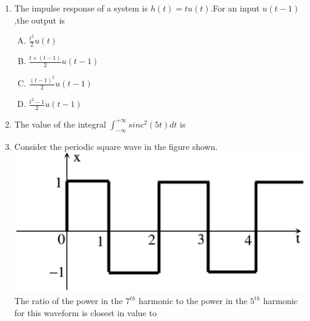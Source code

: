 \documentclass[journal,12pt,twocolumn]{IEEEtran}
\begin{document}
\begin{enumerate}
\begin{enumerate}[(A)]
\end{enumerate}


\item The impulse response of a system is $h(t)=tu(t)$.For an input $u(t-1)$,the output is
\begin{enumerate}[(A)]

\setlength\itemsep{2em}

\item $\frac{t^{2}}{2}u(t)$
\item $\frac{t\times (t-1)}{2}u(t-1)$
\item $\frac{(t-1)^{2}}{2}u(t-1)$
\item $\frac{t^{2}-1}{2}u(t-1)$
\end{enumerate}

\item The value of the integral $\int_{-\infty}^{+\infty} sinc^{2}(5t) dt$ is \underline{\hspace{1cm}}

\item Consider the periodic square wave in the figure shown.
\includegraphics[scale=0.4]{fig13.eps}
\newline The ratio of the power in the $7^{th}$ harmonic to the power in the $5^{th}$ harmonic for this waveform is closest in value to \underline{\hspace{2cm}}\\







\end{enumerate}
\end{document}
